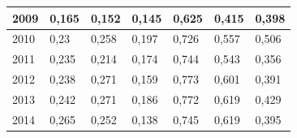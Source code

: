 \begin{table}[H]
\begin{tabular}{|l|l|l|l|l|l|l|}
		2009 & 0,165                                                      & 0,152                                                            & 0,145                                                               & 0,625                                                      & 0,415                                                            & 0,398                                                               \\ \hline
		2010 & 0,23                                                       & 0,258                                                            & 0,197                                                               & 0,726                                                      & 0,557                                                            & 0,506                                                               \\ \hline
		2011 & 0,235                                                      & 0,214                                                            & 0,174                                                               & 0,744                                                      & 0,543                                                            & 0,356                                                               \\ \hline
		2012 & 0,238                                                      & 0,271                                                            & 0,159                                                               & 0,773                                                      & 0,601                                                            & 0,391                                                               \\ \hline
		2013 & 0,242                                                      & 0,271                                                            & 0,186                                                               & 0,772                                                      & 0,619                                                            & 0,429                                                               \\ \hline
		2014 & 0,265                                                      & 0,252                                                            & 0,138                                                               & 0,745                                                      & 0,619                                                            & 0,395                                                               \\ \hline

\end{tabular}
\end{table}
